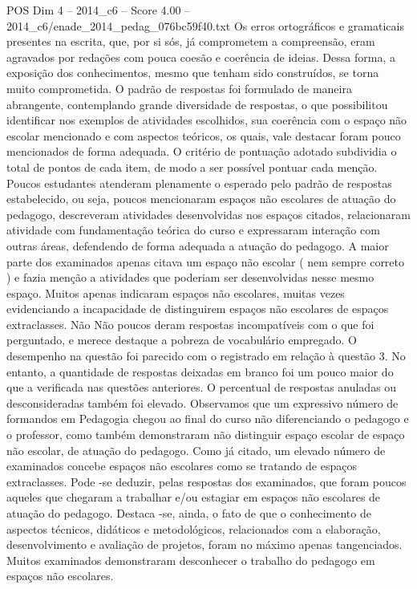 \begin{textsample}{POS Dim 4 – 2014\_c6 – Score 4.00 – 2014\_c6/enade\_2014\_pedag\_076bc59f40.txt}
Os erros ortográficos e gramaticais presentes na escrita, que, por si sós, já comprometem a compreensão, eram agravados por redações com pouca coesão e coerência de ideias.
Dessa forma, a exposição dos conhecimentos, mesmo que tenham sido construídos, se torna muito comprometida.
O padrão de respostas foi formulado de maneira abrangente, contemplando grande diversidade de respostas, o que possibilitou identificar nos exemplos de atividades escolhidos, sua coerência com o espaço não escolar mencionado e com aspectos teóricos, os quais, vale destacar foram pouco mencionados de forma adequada.
O critério de pontuação adotado subdividia o total de pontos de cada item, de modo a ser possível pontuar cada menção.
Poucos estudantes atenderam plenamente o esperado pelo padrão de respostas estabelecido, ou seja, poucos mencionaram espaços não escolares de atuação do pedagogo, descreveram atividades desenvolvidas nos espaços citados, relacionaram atividade com fundamentação teórica do curso e expressaram interação com outras áreas, defendendo de forma adequada a atuação do pedagogo.
A maior parte dos examinados apenas citava um espaço não escolar ( nem sempre correto ) e fazia menção a atividades que poderiam ser desenvolvidas nesse mesmo espaço.
Muitos apenas indicaram espaços não escolares, muitas vezes evidenciando a incapacidade de distinguirem espaços não escolares de espaços extraclasses.
Não Não poucos deram respostas incompatíveis com o que foi perguntado, e merece destaque a pobreza de vocabulário empregado.
O desempenho na questão foi parecido com o registrado em relação à questão 3.
No entanto, a quantidade de respostas deixadas em branco foi um pouco maior do que a verificada nas questões anteriores.
O percentual de respostas anuladas ou desconsideradas também foi elevado.
Observamos que um expressivo número de formandos em Pedagogia chegou ao final do curso não diferenciando o pedagogo e o professor, como também demonstraram não distinguir espaço escolar de espaço não escolar, de atuação do pedagogo.
Como já citado, um elevado número de examinados concebe espaços não escolares como se tratando de espaços extraclasses.
Pode -se deduzir, pelas respostas dos examinados, que foram poucos aqueles que chegaram a trabalhar e/ou estagiar em espaços não escolares de atuação do pedagogo.
Destaca -se, ainda, o fato de que o conhecimento de aspectos técnicos, didáticos e metodológicos, relacionados com a elaboração, desenvolvimento e avaliação de projetos, foram no máximo apenas tangenciados.
Muitos examinados demonstraram desconhecer o trabalho do pedagogo em espaços não escolares.

\end{textsample}

